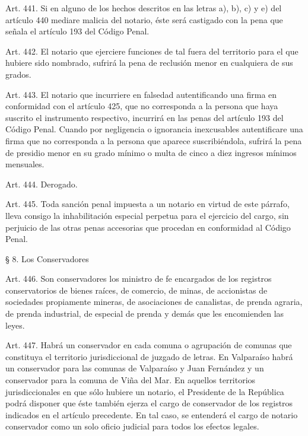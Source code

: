     Art. 441. Si en alguno de los hechos descritos en las letras a), b), c) y e) del artículo 440 mediare malicia del notario, éste será castigado con la pena que señala el artículo 193 del Código Penal.



    Art. 442. El notario que ejerciere funciones de tal fuera del territorio para el que hubiere sido nombrado, sufrirá la pena de reclusión menor en cualquiera de sus grados.


    Art. 443. El notario que incurriere en falsedad autentificando una firma en conformidad con el artículo 425, que no corresponda a la persona que haya suscrito el instrumento respectivo, incurrirá en las penas del artículo 193 del Código Penal.
    Cuando por negligencia o ignorancia inexcusables autentificare una firma que no corresponda a la persona que aparece suscribiéndola, sufrirá la pena de presidio menor en su grado mínimo o multa de cinco a diez ingresos mínimos mensuales.


    Art. 444. Derogado.



    Art. 445. Toda sanción penal impuesta a un notario en virtud de este párrafo, lleva consigo la inhabilitación especial perpetua para el ejercicio del cargo, sin perjuicio de las otras penas accesorias que procedan en conformidad al Código Penal.


    § 8. Los Conservadores


    Art. 446. Son conservadores los ministro de fe encargados de los registros conservatorios de bienes raíces, de comercio, de minas, de accionistas de sociedades propiamente mineras, de asociaciones de canalistas, de prenda agraria, de prenda industrial, de especial de prenda y demás que les encomienden las leyes.


    Art. 447. Habrá un conservador en cada comuna o agrupación de comunas que constituya el territorio jurisdiccional de juzgado de letras.
    En Valparaíso habrá un conservador para las comunas de Valparaíso y Juan Fernández y un conservador para la comuna de Viña del Mar.
    En aquellos territorios jurisdiccionales en que sólo hubiere un notario, el Presidente de la República podrá disponer que éste también ejerza el cargo de conservador de los registros indicados en el artículo precedente. En tal caso, se entenderá el cargo de notario conservador como un solo oficio judicial para todos los efectos legales.



